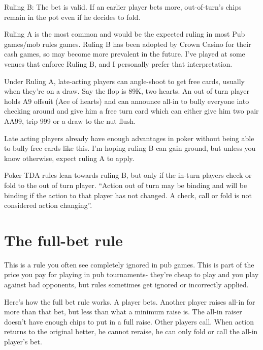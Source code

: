 Ruling B: The bet is valid. If an earlier player bets more, out-of-turn's chips
remain in the pot even if he decides to fold. 

Ruling A is the most common and would be the expected ruling in most
Pub games/mob rules games. Ruling B has been adopted
by Crown Casino for their cash games, so may become more prevalent
in the future. I've played at some venues that enforce Ruling B, and
I personally prefer that interpretation.

Under Ruling A, late-acting players can angle-shoot to get free
cards, usually when they're on a draw. Say the flop is 89K, two hearts.
An out of turn player holds A9 offsuit (Ace of hearts) and can announce
all-in to bully everyone into checking around and give him a free
turn card which can either give him two pair AA99, trip 999 or a draw
to the nut flush.

Late acting players already have enough advantages in poker without 
being able to bully free cards like this. I'm hoping ruling B can 
gain ground, but unless you know otherwise, expect ruling A to apply.

Poker TDA rules lean towards ruling B, but only if the in-turn players
check or fold to the out of turn player. ``Action out of turn may be binding
and will be binding if the action to that player has not changed. A
check, call or fold is not considered action changing''.


\section{The full-bet rule}

This is a rule you often see completely ignored in pub games. 
This is part of the price you pay for playing
in pub tournaments- they're cheap to play and you play against
bad opponents, but rules sometimes get ignored or incorrectly applied.


Here's how the full bet rule works. A player bets. Another player 
raises all-in for more than that bet, but less than what a minimum raise is. 
The all-in raiser doesn't have enough chips to put in a full raise. 
Other players call. When action returns to the original better, he 
cannot reraise, he can only fold or call the all-in player's bet.

